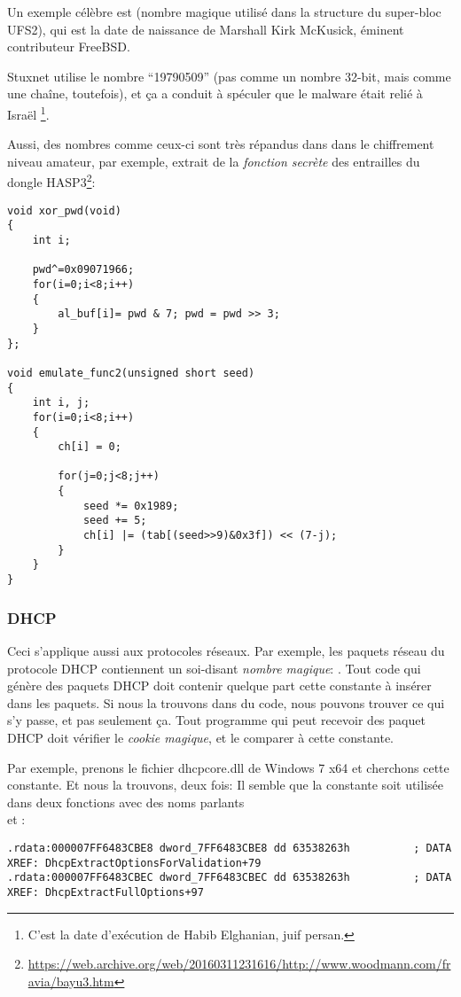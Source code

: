 Un exemple célèbre est  (nombre magique utilisé dans la structure
du super-bloc UFS2), qui est la date de naissance de Marshall Kirk McKusick, éminent
contributeur FreeBSD.

Stuxnet utilise le nombre ``19790509'' (pas comme un nombre 32-bit, mais comme une
chaîne, toutefois), et ça a conduit à spéculer que le malware était relié à Israël%
\footnote{C'est la date d'exécution de Habib Elghanian, juif persan.}.

Aussi, des nombres comme ceux-ci sont très répandus dans dans le chiffrement niveau
amateur, par exemple, extrait de la \emph{fonction secrète} des entrailles du dongle
HASP3\footnote{\url{https://web.archive.org/web/20160311231616/http://www.woodmann.com/fravia/bayu3.htm}}:

\begin{lstlisting}[style=customc]
void xor_pwd(void)
{
	int i;

	pwd^=0x09071966;
	for(i=0;i<8;i++)
	{
		al_buf[i]= pwd & 7; pwd = pwd >> 3;
	}
};

void emulate_func2(unsigned short seed)
{
	int i, j;
	for(i=0;i<8;i++)
	{
		ch[i] = 0;

		for(j=0;j<8;j++)
		{
			seed *= 0x1989;
			seed += 5;
			ch[i] |= (tab[(seed>>9)&0x3f]) << (7-j);
		}
	}
}
\end{lstlisting}

\subsubsection{DHCP}

Ceci s'applique aussi aux protocoles réseaux.
Par exemple, les paquets réseau du protocole DHCP contiennent un soi-disant \emph{nombre
magique}: .
Tout code qui génère des paquets DHCP doit contenir quelque part cette constante
à insérer dans les paquets.
Si nous la trouvons dans du code, nous pouvons trouver ce qui s'y passe, et pas seulement ça.
Tout programme qui peut recevoir des paquet DHCP doit vérifier le \emph{cookie magique},
et le comparer à cette constante.

Par exemple, prenons le fichier dhcpcore.dll de Windows 7 x64 et cherchons cette constante.
Et nous la trouvons, deux fois:
Il semble que la constante soit utilisée dans deux fonctions avec des noms parlants\\
 et :

\begin{lstlisting}[caption=dhcpcore.dll (Windows 7 x64),style=customasmx86]
.rdata:000007FF6483CBE8 dword_7FF6483CBE8 dd 63538263h          ; DATA XREF: DhcpExtractOptionsForValidation+79
.rdata:000007FF6483CBEC dword_7FF6483CBEC dd 63538263h          ; DATA XREF: DhcpExtractFullOptions+97
\end{lstlisting}

